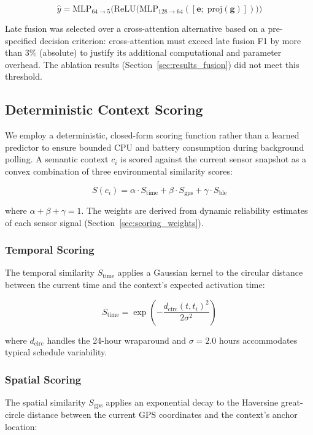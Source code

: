 \documentclass[journal]{IEEEtran}
\begin{document}
\begin{equation}
\hat{y} = \text{MLP}_{64 \rightarrow 5}\big(\text{ReLU}\big(\text{MLP}_{128 \rightarrow 64}([\mathbf{e};\; \text{proj}(\mathbf{g})])\big)\big)
\label{eq:late_fusion}
\end{equation}

Late fusion was selected over a cross-attention alternative based on a pre-specified decision criterion: cross-attention must exceed late fusion F1 by more than 3\% (absolute) to justify its additional computational and parameter overhead. The ablation results (Section~\ref{sec:results_fusion}) did not meet this threshold.

\subsection{Deterministic Context Scoring}
\label{sec:scoring}

We employ a deterministic, closed-form scoring function rather than a learned predictor to ensure bounded CPU and battery consumption during background polling. A semantic context $c_i$ is scored against the current sensor snapshot as a convex combination of three environmental similarity scores:

\begin{equation}
S(c_i) = \alpha \cdot S_{\text{time}} + \beta \cdot S_{\text{gps}} + \gamma \cdot S_{\text{ble}}
\label{eq:scoring}
\end{equation}

\noindent where $\alpha + \beta + \gamma = 1$. The weights are derived from dynamic reliability estimates of each sensor signal (Section~\ref{sec:scoring_weights}).

\subsubsection{Temporal Scoring}
The temporal similarity $S_{\text{time}}$ applies a Gaussian kernel to the circular distance between the current time and the context's expected activation time:

\begin{equation}
S_{\text{time}} = \exp\!\left(-\frac{d_{\text{circ}}(t, t_i)^2}{2\sigma^2}\right)
\label{eq:time_score}
\end{equation}

\noindent where $d_{\text{circ}}$ handles the 24-hour wraparound and $\sigma = 2.0$ hours accommodates typical schedule variability.

\subsubsection{Spatial Scoring}
The spatial similarity $S_{\text{gps}}$ applies an exponential decay to the Haversine great-circle distance between the current GPS coordinates and the context's anchor location:
\end{document}
